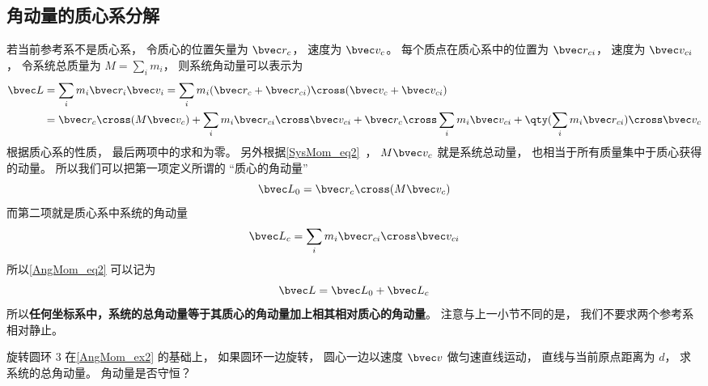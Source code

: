 \subsection{角动量的质心系分解}
若当前参考系不是质心系， 令质心的位置矢量为 $\bvec r_c$， 速度为 $\bvec v_c$。 每个质点在质心系中的位置为 $\bvec r_{ci}$， 速度为 $\bvec v_{ci}$， 令系统总质量为 $M = \sum_i m_i$， 则系统角动量可以表示为
\begin{equation}\label{AngMom_eq2}
\begin{aligned}
\bvec L &= \sum_i m_i \bvec r_i \bvec v_i = \sum_i m_i (\bvec r_c + \bvec r_{ci})\cross( \bvec v_c + \bvec v_{ci})\\
&= \bvec r_c \cross (M\bvec v_c) + \sum_i m_i \bvec r_{ci}\cross \bvec v_{ci} + \bvec r_c \cross \sum_i m_i \bvec v_{ci} + \qty(\sum_i m_i \bvec r_{ci}) \cross \bvec v_c
\end{aligned}
\end{equation}
根据质心系的性质， 最后两项中的求和为零。 另外根据\autoref{SysMom_eq2}~， $M\bvec v_c$ 就是系统总动量， 也相当于所有质量集中于质心获得的动量。 所以我们可以把第一项定义所谓的 “质心的角动量”
\begin{equation}
\bvec L_0 = \bvec r_c \cross (M \bvec v_c)
\end{equation}
而第二项就是质心系中系统的角动量
\begin{equation}
\bvec L_c = \sum_i m_i \bvec r_{ci}\cross \bvec v_{ci}
\end{equation}
所以\autoref{AngMom_eq2} 可以记为
\begin{equation}\label{AngMom_eq3}
\bvec L = \bvec L_0 + \bvec L_c
\end{equation}
所以\textbf{任何坐标系中，系统的总角动量等于其质心的角动量加上相其相对质心的角动量}。 注意与上一小节不同的是， 我们不要求两个参考系相对静止。

\begin{exercise}{旋转圆环 3}
在\autoref{AngMom_ex2} 的基础上， 如果圆环一边旋转， 圆心一边以速度 $\bvec v$ 做匀速直线运动， 直线与当前原点距离为 $d$， 求系统的总角动量。 角动量是否守恒？
\end{exercise}
